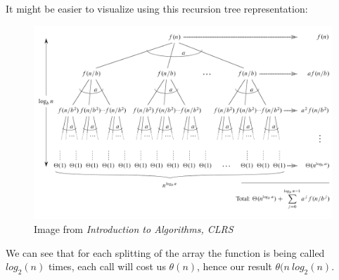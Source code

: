 \documentclass[12pt]{article}
\begin{document}
                                                                                                                                                                                                                                                                    It might be easier to visualize using this recursion tree representation:
                                                                                                                                                                                                                                                                    \begin{figure}[h]                                                                                                                                                                                                                                                                    \caption{Image from \textit{Introduction to Algorithms, CLRS}}                                                                                                                                                                                                                                                                     \includegraphics[scale=.35]{./recursion_tree_clrs.png}                                                                                                                                                                                                                                                                   
\centering
\end{figure}

We can see that for each splitting of the array the function is being called $log_2{(n)}$ times, each call will cost us $\theta(n)$, hence our result $\theta(n\ log_2{(n)}$.
\end{document}
